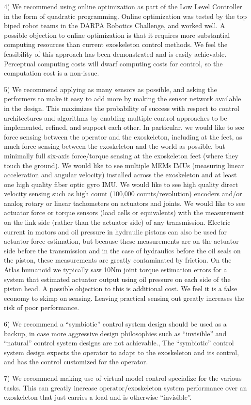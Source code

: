\documentclass[letterpaper,12pt,fullpage]{article}
\begin{document}
4) We recommend using online optimization as part of the Low Level Controller
in the form of quadratic programming. Online optimization
was tested by the top biped robot
teams in the DARPA Robotics Challenge, and worked well.
A possible objection to online optimization
is that it requires more substantial computing
resources than current exoskeleton control methods. We feel the feasibility
of this approach has been demonstrated and is easily achievable. Perceptual
computing costs will dwarf computing costs for control, 
so the computation cost is a non-issue.

5) We recommend applying as many sensors as possible, and asking the performers
to make it easy to add more by making the sensor network available in the design.
This maximizes the probability of success
with respect to control architectures and algorithms by enabling multiple control
approaches to be implemented, refined, and support each other.
In particular, we would like to see force sensing between the operator and the
exoskeleton, including at the feet, as much force sensing between the exoskeleton 
and the world as possible, but minimally full six-axis force/torque sensing at
the exoskeleton feet (where they touch the ground). We would like to see multiple MEMs
IMUs (measuring linear acceleration and angular velocity) installed across 
the exoskeleton and at least one high quality fiber optic gyro IMU. 
We would like to see high quality direct velocity sensing
such as high count (100,000 counts/revolution) encoders and/or 
analog rotary or linear tachometers on actuators and joints. 
We would like to see actuator force or torque sensors
(load cells or equivalents) with the measurement on the link side (rather than
the actuator side) of any transmission. Electric current in motors and oil
pressure in hydraulic pistons can also be used for actuator force estimation,
but because these measurements are on the actuator side before the transmission
and in the case of hydraulics before the oil seals on the piston, these measurements
are greatly contaminated by friction. On the Atlas humanoid we typically saw 10Nm
joint torque estimation errors for a system that estimated actuator output using
oil pressure on each side of the piston head.
A possible objection to this is additional cost. We feel it is a false
economy to skimp on sensing. Leaving practical sensing out greatly increases
the risk of poor performance.

6) We recommend a ``symbiotic'' control system design should be used as a backup,
in case more aggressive design philosophies such as ``invisible'' and ``natural''
control system designs are not achievable.,
The ``symbiotic'' control system design
expects the operator to adapt to the exoskeleton and its control,
and has the control customized for the operator.

7) We recommend making use of virtual model control specialize
for the various tasks. This can greatly increase operator/exoskeleton system
performance over an exoskeleton that just carries a load and is otherwise
``invisible''.



\end{document}
